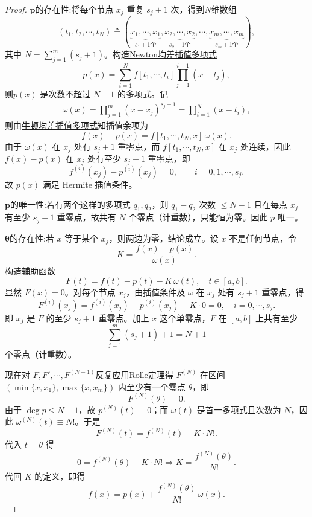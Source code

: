 \documentclass[../../main.tex]{subfiles}%
\begin{document}
\begin{proof}

$\boldsymbol{p}${\heiti 的存在性}:将每个节点 $x_j$ 重复 $s_j+1$ 次，得到$N$维数组
\[
\left( t_1,t_2,\cdots ,t_N \right) \triangleq \left( \underset{s_1+1\text{个}}{\underbrace{x_1,\cdots ,x_1}},\underset{s_2+1\text{个}}{\underbrace{x_2,\cdots ,x_2}},\cdots ,\underset{s_m+1\text{个}}{\underbrace{x_m,\cdots ,x_m}} \right) ,
\]
其中 $N = \sum_{j=1}^m (s_j+1)$。构造\hyperref[Numerical-Analysis-theorem:牛顿均差插值多项式]{Newton均差插值多项式}
\[
p(x) = \sum_{i=1}^{N} f[t_1,\cdots,t_i] \prod_{j=1}^{i-1} (x - t_j),
\]
则$p(x)$ 是次数不超过 $N-1$ 的多项式。记
\begin{align*}
\omega(x)=\prod_{j=1}^m (x-x_j)^{s_j+1}=\prod_{i=1}^N (x-t_i),
\end{align*}
则由\hyperref[Numerical-Analysis-theorem:牛顿均差插值多项式]{牛顿均差插值多项式}知插值余项为
\[
f(x)-p(x)=f[t_1,\cdots,t_N,x]\,\omega(x).
\]
由于 $\omega(x)$ 在 $x_j$ 处有 $s_j+1$ 重零点，而 $f[t_1,\cdots,t_N,x]$ 在 $x_j$ 处连续，因此 $f(x)-p(x)$ 在 $x_j$ 处有至少 $s_j+1$ 重零点，即
\[
f^{(i)}(x_j)-p^{(i)}(x_j)=0,\qquad i=0,1,\cdots,s_j.
\]
故 $p(x)$ 满足 Hermite 插值条件。

$\boldsymbol{p}${\heiti 的唯一性}:若有两个这样的多项式 $q_1,q_2$，则 $q_1-q_2$ 次数 $\leqslant N-1$ 且在每点 $x_j$ 有至少 $s_j+1$ 重零点，故共有 $N$ 个零点（计重数），只能恒为零。因此 $p$ 唯一。

$\boldsymbol{\theta }${\heiti 的存在性}:若 $x$ 等于某个 $x_j$，则两边为零，结论成立。设 $x$ 不是任何节点，令
\[
K = \frac{f(x)-p(x)}{\omega(x)}.
\]
构造辅助函数
\[
F(t) = f(t) - p(t) - K\,\omega(t),\quad t\in[a,b].
\]
显然 $F(x)=0$。对每个节点 $x_j$，由插值条件及 $\omega$ 在 $x_j$ 处有 $s_j+1$ 重零点，得
\[
F^{(i)}(x_j) = f^{(i)}(x_j)-p^{(i)}(x_j)-K\cdot0 = 0,\quad i=0,\cdots,s_j.
\]
即 $x_j$ 是 $F$ 的至少 $s_j+1$ 重零点。加上 $x$ 这个单零点，$F$ 在 $[a,b]$ 上共有至少
\[
\sum_{j=1}^m (s_j+1) + 1 = N+1
\]
个零点（计重数）。

现在对 $F,F',\cdots,F^{(N-1)}$反复应用\hyperref[theorem:加强的Rolle中值定理]{Rolle定理}得 $F^{(N)}$ 在区间 $(\min\{x,x_1\},\max\{x,x_m\})$ 内至少有一个零点 $\theta$，即
\[
F^{(N)}(\theta)=0.
\]
由于 $\deg p \leqslant N-1$，故 $p^{(N)}(t)\equiv0$；而 $\omega(t)$ 是首一多项式且次数为 $N$，因此 $\omega^{(N)}(t) \equiv N!$。于是
\[
F^{(N)}(t) = f^{(N)}(t) - K\cdot N!.
\]
代入 $t=\theta$ 得
\[
0 = f^{(N)}(\theta) - K\cdot N! \Longrightarrow K = \frac{f^{(N)}(\theta)}{N!}.
\]
代回 $K$ 的定义，即得
\[
f(x) =p(x) + \frac{f^{(N)}(\theta)}{N!}\,\omega(x).
\]
\end{proof}
\end{document}
